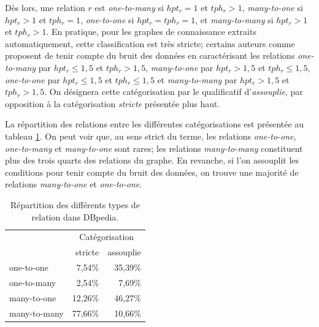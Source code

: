 Dès lors, une relation $r$ est \textit{one-to-many} si $hpt_r = 1$ et $tph_r > 1$, \textit{many-to-one} si $hpt_r > 1$ et $tph_r = 1$, \textit{one-to-one} si $hpt_r = tph_r = 1$, et \textit{many-to-many} si $hpt_r > 1$ et $tph_r > 1$. En pratique, pour les graphes de connaissance extraits automatiquement, cette classification est très stricte; certains auteurs comme \cite{bordes2013translating, transh} proposent de tenir compte du bruit des données en caractérisant les relations \textit{one-to-many} par $hpt_r \leq 1,5$ et $tph_r > 1,5$, \textit{many-to-one} par $hpt_r > 1,5$ et $tph_r \leq 1,5$, \textit{one-to-one} par $hpt_r \leq 1,5$ et $tph_r \leq  1,5$ et \textit{many-to-many} par $hpt_r > 1,5$ et $tph_r > 1,5$. On désignera cette catégorisation par le qualificatif d'\textit{assouplie}, par opposition à la catégorisation \textit{stricte} présentée plus haut.

La répartition des relations entre les différentes catégorisations est présentée au tableau \ref{tab:litt-rel-cardinalities}. On peut voir que, au sens strict du terme, les relations \textit{one-to-one}, \textit{one-to-many} et \textit{many-to-one} sont rares; les relations \textit{many-to-many} constituent plus des trois quarts des relations du graphe. En revanche, si l'on assouplit les conditions pour tenir compte du bruit des données, on trouve une majorité de relations \textit{many-to-one} et \textit{one-to-one}. 


\begin{table}[ht]
    \centering
    \caption{Répartition des différents types de relation dans DBpedia.}
    \begin{tabular}{|l|rr|}
    \hline
& \multicolumn{2}{c|}{Catégorisation} \\
& stricte & assouplie \\ \hline
one-to-one & 7,54\% & 35,39\% \\
one-to-many & 2,54\% & 7,69\% \\
many-to-one & 12,26\% & 46,27\% \\
many-to-many & 77,66\% & 10,66\% \\
\hline
    \end{tabular}
    \label{tab:litt-rel-cardinalities}
\end{table}

